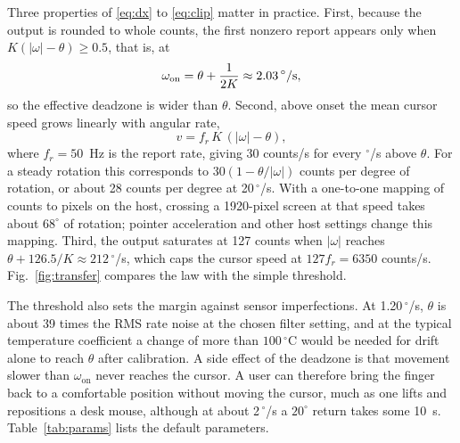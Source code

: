 \documentclass[journal]{IEEEtran}
\newcommand{\dps}{\ensuremath{^{\circ}}/s}
\newcommand{\degC}{\ensuremath{^{\circ}}C}
\begin{document}
Three properties of \eqref{eq:dx} to \eqref{eq:clip} matter in practice. First, because the output is rounded to whole counts, the first nonzero report appears only when $K(|\omega|-\theta)\geq0.5$, that is, at
\begin{equation}
\omega_{\mathrm{on}}=\theta+\frac{1}{2K}\approx2.03\,\text{\dps},
\label{eq:onset}
\end{equation}
so the effective deadzone is wider than $\theta$. Second, above onset the mean cursor speed grows linearly with angular rate,
\begin{equation}
v=f_r\,K\,(|\omega|-\theta),
\label{eq:speed}
\end{equation}
where $f_r=50$~Hz is the report rate, giving 30 counts/s for every \dps{} above $\theta$. For a steady rotation this corresponds to $30(1-\theta/|\omega|)$ counts per degree of rotation, or about 28 counts per degree at 20\,\dps. With a one-to-one mapping of counts to pixels on the host, crossing a 1920-pixel screen at that speed takes about $68^{\circ}$ of rotation; pointer acceleration and other host settings change this mapping. Third, the output saturates at 127 counts when $|\omega|$ reaches $\theta+126.5/K\approx212$\,\dps, which caps the cursor speed at $127f_r=6350$ counts/s. Fig.~\ref{fig:transfer} compares the law with the simple threshold.

The threshold also sets the margin against sensor imperfections. At 1.20\,\dps, $\theta$ is about 39 times the RMS rate noise at the chosen filter setting, and at the typical temperature coefficient a change of more than $100$\,\degC{} would be needed for drift alone to reach $\theta$ after calibration. A side effect of the deadzone is that movement slower than $\omega_{\mathrm{on}}$ never reaches the cursor. A user can therefore bring the finger back to a comfortable position without moving the cursor, much as one lifts and repositions a desk mouse, although at about 2\,\dps{} a $20^{\circ}$ return takes some 10~s. Table~\ref{tab:params} lists the default parameters.
\end{document}
